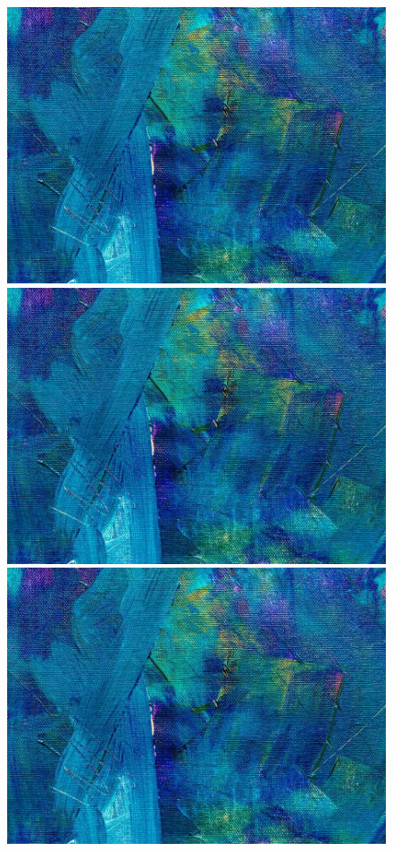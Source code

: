 \documentclass{report}
\theoremstyle{definition}
\begin{document}
\begin{figure}[htbp]
\centering
\includegraphics[scale=0.2]{pexels-1509534.jpg}
\includegraphics[scale=0.2]{pexels-1509534.jpg}
\\[\smallskipamount]
\includegraphics[scale=0.2]{pexels-1509534.jpg}

\end{figure}
\end{document}
